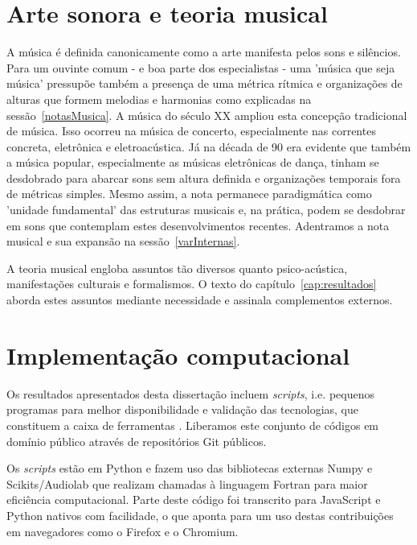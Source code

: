     \section{Arte sonora e teoria musical}

A música é definida canonicamente como a arte manifesta pelos sons e silêncios. Para um ouvinte comum - e boa parte dos especialistas - uma 'música que seja música' pressupõe também a presença de uma métrica rítmica e organizações de alturas que formem melodias e harmonias como explicadas na sessão~\ref{notasMusica}. A música do século XX ampliou esta concepção tradicional de música. Isso ocorreu na música de concerto, especialmente nas correntes concreta, eletrônica e eletroacústica. Já na década de 90 era evidente que também a música popular, especialmente as músicas eletrônicas de dança, tinham se desdobrado para abarcar sons sem altura definida e organizações temporais fora de métricas simples. Mesmo assim, a nota permanece paradigmática como 'unidade fundamental' das estruturas musicais e, na prática, podem se desdobrar em sons que contemplam estes desenvolvimentos recentes. Adentramos a nota musical e sua expansão na sessão~\ref{varInternas}.\cite{Wisnick,Webern,Lerdahl,Cook}

A teoria musical engloba assuntos tão diversos quanto psico-acústica, manifestações culturais e formalismos. O texto do capítulo~\ref{cap:resultados} aborda estes assuntos mediante necessidade e assinala complementos externos.\cite{Zamacois,Schoenberg,microsound}



    \section{Implementação computacional}
Os resultados apresentados desta dissertação incluem \emph{scripts}, i.e. pequenos programas para melhor disponibilidade e validação das tecnologias, que constituem a caixa de ferramentas \massa. Liberamos este conjunto de códigos em domínio público através de repositórios Git públicos.\cite{gitBook}

Os \emph{scripts} estão em Python e fazem uso das bibliotecas externas Numpy e Scikits/Audiolab que realizam chamadas à linguagem Fortran para maior eficiência computacional. Parte deste código foi transcrito para JavaScript e Python nativos com facilidade, o que aponta para um uso destas contribuições em navegadores como o Firefox e o Chromium.\cite{numpy,audiolab,tutPython,python}


